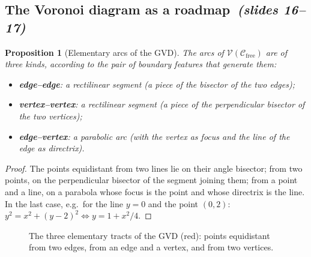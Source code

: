 \documentclass[11pt,a4paper]{article}
\newcommand{\Cfree}{\mathcal{C}_{\mathrm{free}}}
\newcommand{\Vor}{\mathcal{V}}
\newcommand{\slides}[1]{\emph{(slides #1)}}
\newcommand{\subsect}[2]{\subsection{#1\texorpdfstring{\ \slides{#2}}{ (slides #2)}}}
\theoremstyle{definition}
\theoremstyle{plain}
\newtheorem{proposition}[definition]{Proposition}
\theoremstyle{remark}
\begin{document}
\subsect{The Voronoi diagram as a roadmap}{16--17}

\begin{proposition}[Elementary arcs of the GVD]
\label{prop:arcs}
The arcs of $\Vor(\Cfree)$ are of three kinds, according to the pair of boundary features that generate them:
\begin{itemize}
  \item \textbf{edge--edge}: a \emph{rectilinear} segment (a piece of the bisector of the two edges);
  \item \textbf{vertex--vertex}: a \emph{rectilinear} segment (a piece of the perpendicular bisector of the two vertices);
  \item \textbf{edge--vertex}: a \emph{parabolic} arc (with the vertex as focus and the line of the edge as directrix).
\end{itemize}
\end{proposition}
\begin{proof}
The points equidistant from two lines lie on their angle bisector; from two points, on the perpendicular bisector of the segment joining them; from a point and a line, on a parabola whose focus is the point and whose directrix is the line. In the last case, e.g.\ for the line $y=0$ and the point $(0,2)$: $y^2=x^2+(y-2)^2\iff y=1+x^2/4$.
\end{proof}

\begin{figure}[H]
\centering
{}
\caption{The three elementary tracts of the GVD (red): points equidistant from two edges, from an edge and a vertex, and from two vertices.}
\label{fig:tracts}
\end{figure}
\end{document}
